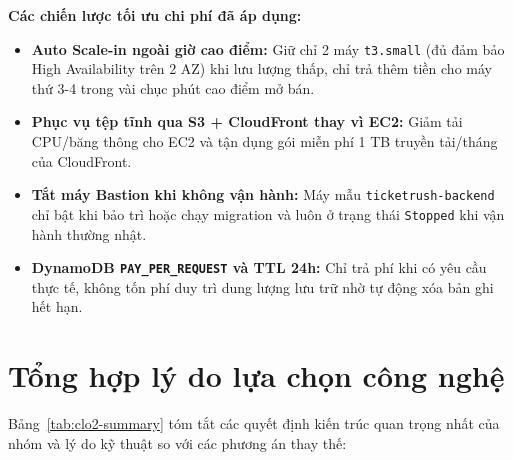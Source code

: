 \noindent\textbf{Các chiến lược tối ưu chi phí đã áp dụng:}
\begin{itemize}[leftmargin=1.5em]
  \item \textbf{Auto Scale-in ngoài giờ cao điểm:} Giữ chỉ 2 máy \texttt{t3.small} (đủ đảm bảo High Availability trên 2 AZ) khi lưu lượng thấp, chỉ trả thêm tiền cho máy thứ 3-4 trong vài chục phút cao điểm mở bán.
  \item \textbf{Phục vụ tệp tĩnh qua S3 + CloudFront thay vì EC2:} Giảm tải CPU/băng thông cho EC2 và tận dụng gói miễn phí 1 TB truyền tải/tháng của CloudFront.
  \item \textbf{Tắt máy Bastion khi không vận hành:} Máy mẫu \texttt{ticketrush-backend} chỉ bật khi bảo trì hoặc chạy migration và luôn ở trạng thái \texttt{Stopped} khi vận hành thường nhật.
  \item \textbf{DynamoDB \texttt{PAY\_PER\_REQUEST} và TTL 24h:} Chỉ trả phí khi có yêu cầu thực tế, không tốn phí duy trì dung lượng lưu trữ nhờ tự động xóa bản ghi hết hạn.
\end{itemize}

\section{Tổng hợp lý do lựa chọn công nghệ}
Bảng~\ref{tab:clo2-summary} tóm tắt các quyết định kiến trúc quan trọng nhất của nhóm và lý do kỹ thuật so với các phương án thay thế:

